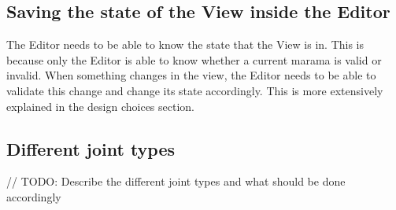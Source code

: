 \documentclass[10pt]{extarticle} %
\begin{document}
    \subsection{Saving the state of the View inside the Editor}
    The Editor needs to be able to know the state that the View is in.
    This is because only the Editor is able to know whether a current marama is valid or invalid.
    When something changes in the view, the Editor needs to be able to validate this change and change its state accordingly.
    This is more extensively explained in the design choices\cite{sec:marama-storage} section.

    \subsection{Different joint types}
    // TODO: Describe the different joint types and what should be done accordingly


    \newpage
    
    
\end{document}
